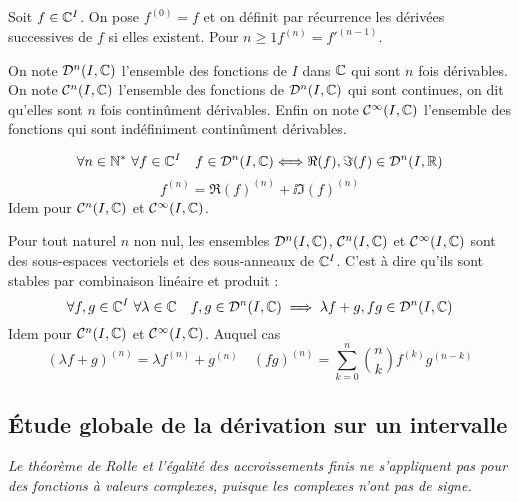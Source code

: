 \begin{defdef}
  Soit \(f \in \mathbb{C}^I\). On pose \(f^{(0)}=f\) et on définit par récurrence les
  dérivées successives de \(f\) si elles existent. Pour \(n \geqslant 1
  f^{(n)}=f'^{(n-1)}\).

  On note \(\mathcal{D}^n(I,\mathbb{C})\) l'ensemble des fonctions de \(I\) dans \(\mathbb{C}\) qui sont
  \(n\) fois dérivables. On note \(\mathcal{C}^{n}(I,\mathbb{C})\) l'ensemble des fonctions
  de \(\mathcal{D}^n(I,\mathbb{C})\)  qui sont continues, on dit qu'elles sont \(n\) fois
  continûment dérivables. Enfin on note \(\mathcal{C}^{\infty}(I,\mathbb{C})\) l'ensemble des
  fonctions qui sont indéfiniment continûment dérivables.
\end{defdef}
\begin{prop}
  \begin{equation}
    \forall n \in \mathbb{N}^* \ \forall f \in \mathbb{C}^I \quad f \in \mathcal{D}^{n}(I,\mathbb{C})
    \Longleftrightarrow \Re(f), \Im(f) \in \mathcal{D}^{n}(I,\mathbb{R})
  \end{equation}
  \begin{equation}
    f^{(n)}=\Re(f)^{(n)}+\ii\Im(f)^{(n)}
  \end{equation}
  Idem pour \(\mathcal{C}^{n}(I,\mathbb{C})\) et \(\mathcal{C}^{\infty}(I,\mathbb{C})\).
\end{prop}
\begin{prop}
  Pour tout naturel \(n\) non nul, les ensembles \(\mathcal{D}^{n}(I,\mathbb{C})\),
  \(\mathcal{C}^{n}(I,\mathbb{C})\) et \(\mathcal{C}^{\infty}(I,\mathbb{C})\) sont des sous-espaces
  vectoriels et des sous-anneaux de \(\mathbb{C}^I\). C'est à dire qu'ils sont stables
  par combinaison linéaire et produit :
  \begin{equation}
    \forall f,g \in \mathbb{C}^I \ \forall \lambda \in \mathbb{C} \quad f,g \in \mathcal{D}^n(I,\mathbb{C})
    \implies \lambda f +g, fg \in \mathcal{D}^n(I,\mathbb{C})
  \end{equation}
  Idem pour \(\mathcal{C}^{n}(I,\mathbb{C})\) et \(\mathcal{C}^{\infty}(I,\mathbb{C})\). Auquel cas
  \begin{equation}
    (\lambda f +g)^{(n)}=\lambda f^{(n)} + g^{(n)} \quad (fg)^{(n)} =
    \sum_{k=0}^n \binom{n}{k} f^{(k)}g^{(n-k)}
  \end{equation}
\end{prop}

\subsection{Étude globale de la dérivation sur un intervalle}

\emph{Le théorème de Rolle et l'égalité des accroissements finis ne s'appliquent
pas pour des fonctions à valeurs complexes, puisque les complexes n'ont pas de
signe.}

